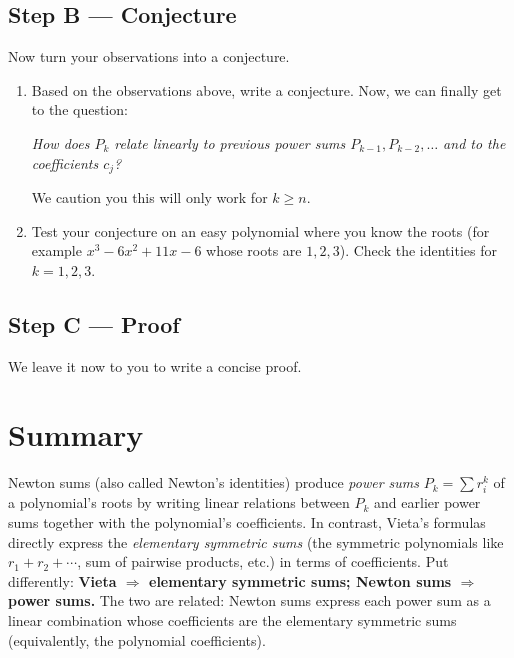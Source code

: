 \documentclass{tufte-handout}
\begin{document}
\vspace{3em}

\subsection*{Step B — Conjecture}
Now turn your observations into a conjecture.

\begin{enumerate}[label=\textbf{B\arabic*.}, leftmargin=*, itemsep=1em]
  \item Based on the observations above, write a conjecture. Now, we can finally get to the question:
  
  \textit{How does $P_k$ relate linearly to previous power sums $P_{k-1},P_{k-2},\dots$ and to the coefficients $c_j$?}

  We caution you this will only work for $k\ge n$.

  \vspace{20em}
  
  \item Test your conjecture on an easy polynomial where you know the roots (for example $x^3-6x^2+11x-6$ whose roots are $1,2,3$). Check the identities for $k=1,2,3$.

  \vspace{10em}
\end{enumerate}

\subsection*{Step C — Proof}
We leave it now to you to write a concise proof.

\vspace{20em}
\section*{Summary}

Newton sums (also called Newton's identities) produce \emph{power sums} $P_k=\sum r_i^k$ of a polynomial's roots by writing linear relations between $P_k$ and earlier power sums together with the polynomial's coefficients. In contrast, Vieta's formulas directly express the \emph{elementary symmetric sums} (the symmetric polynomials like $r_1+r_2+\cdots$, sum of pairwise products, etc.) in terms of coefficients. Put differently: \textbf{Vieta $\Rightarrow$ elementary symmetric sums; Newton sums $\Rightarrow$ power sums.} The two are related: Newton sums express each power sum as a linear combination whose coefficients are the elementary symmetric sums (equivalently, the polynomial coefficients).
\end{document}
